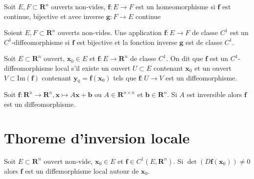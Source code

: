 \begin{definition}
Soit $E,F\subset \mathbf{R}^{n}$ ouverts non-vides, $\boldsymbol{f}:E\to F$ est un homeomorphisme si $\boldsymbol{f}$ est continue, bijective et avec inverse $\boldsymbol{g}:F\to E$ continue
\end{definition}
\begin{definition}
Soient $E,F\subset \mathbf{R}^{n}$ ouverts non-vides. Une application $\boldsymbol{f}:E\to F$ de classe $C^{1}$ est un $C^{1}$-diffeomorphisme si $\boldsymbol{f}$ est bijective et la fonction inverse $\boldsymbol{g}$ est de classe $C^{1}$.
\end{definition}
\begin{definition}
Soit $E\subset \mathbf{R}^{n}$ ouvert, $\boldsymbol{x}_{0}\in E$ et $\boldsymbol{f}:E\to \mathbf{R}^{n}$ de classe $C^{1}$. On dit que $\boldsymbol{f}$ est un $C^{1}$-diffeomorphisme local s'il existe un ouvert $U\subset E$ contenant $\boldsymbol{x}_{0}$ et un ouvert $V\subset \mathrm{Im}(\boldsymbol{f})$ contenant $\boldsymbol{y}_{0}=\boldsymbol{f}(\boldsymbol{x}_{0})$ tels que $\boldsymbol{f}:U\to V$ est un diffeomorphisme.
\end{definition}
\begin{example}
Soit $\boldsymbol{f}:\mathbf{R}^{n}\to \mathbf{R}^{n},\boldsymbol{x}\mapsto A\boldsymbol{x}+\boldsymbol{b}$ ou $A\in \mathbf{R}^{n\times n}$ et $\boldsymbol{b}\in \mathbf{R}^{n}$. Si $A$ est inversible alors $\boldsymbol{f}$ est un diffeomorphisme.
\end{example}

\section{Thoreme d'inversion locale}
\begin{theorem}\label{locinv}
Soit $E\subset \mathbf{R}^{n}$ ouvert non-vide, $\boldsymbol{x}_{0}\in E$ et $\boldsymbol{f}\in C^{1}(E,\mathbf{R}^{n})$. Si $\det(D\boldsymbol{f}(\boldsymbol{x}_{0}))\neq 0$ alors $\boldsymbol{f}$ est un diffemorphisme local autour de $\boldsymbol{x}_{0}$. 
\end{theorem}
